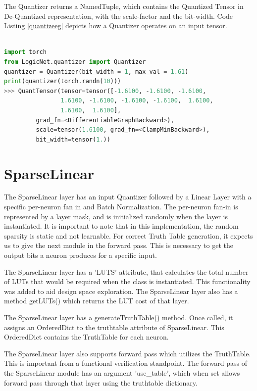 The Quantizer returns a NamedTuple, which contains the Quantized Tensor in De-Quantized representation, with the scale-factor and the bit-width. Code Listing \ref{quantizeeg} depicts how a Quantizer operates on an input tensor.\\\\
\begin{lstlisting}[language=Python, caption=Example of a Quantizer, label=quantizeeg]
import torch
from LogicNet.quantizer import Quantizer
quantizer = Quantizer(bit_width = 1, max_val = 1.61)
print(quantizer(torch.randn(10)))
>>> QuantTensor(tensor=tensor([-1.6100, -1.6100, -1.6100,  
                1.6100, -1.6100, -1.6100, -1.6100,  1.6100,
                1.6100,  1.6100],
         grad_fn=<DifferentiableGraphBackward>),    
         scale=tensor(1.6100, grad_fn=<ClampMinBackward>), 
         bit_width=tensor(1.))
\end{lstlisting}

\section{SparseLinear}
The SparseLinear layer has an input Quantizer followed by a Linear Layer with a specific per-neuron fan in and Batch Normalization. The per-neuron fan-in is represented by a layer mask, and is initialized randomly when the layer is instantiated. It is important to note that in this implementation, the random sparsity is static and not learnable. For correct Truth Table generation, it expects us to give the next module in the forward pass. This is necessary to get the output bits a neuron produces for a specific input.

The SparseLinear layer has a 'LUTS' attribute, that calculates the total number of LUTs that would be required when the class is instantiated. This functionality was added to aid design space exploration. The SparseLinear layer also has a method getLUTs() which returns the LUT cost of that layer.

The SparseLinear layer has a generateTruthTable() method. Once called, it assigns an OrderedDict to the truthtable attribute of SparseLinear. This OrderedDict contains the TruthTable for each neuron.

The SparseLinear layer also supports forward pass which utilizes the TruthTable. This is important from a functional verification standpoint. The forward pass of the SparseLinear module has an argument 'use\_table', which when set allows forward pass through that layer using the truthtable dictionary.

